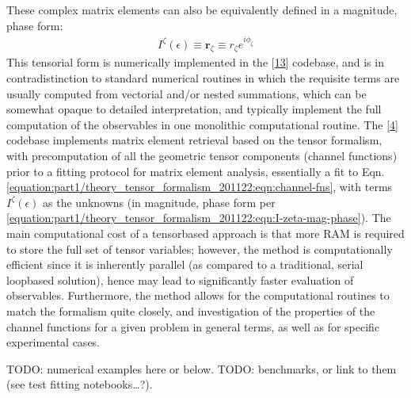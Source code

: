 \documentclass[letterpaper,table,10pt,english]{jupyterBook}
\begin{document}
\sphinxAtStartPar
These complex matrix elements can also be equivalently defined in a magnitude, phase
form:
\begin{equation}\label{equation:part1/theory_tensor_formalism_201122:eqn:I-zeta-mag-phase}
\begin{split}I^{\zeta}(\epsilon)\equiv\mathbf{r}_{\zeta}\equiv r_{\zeta}e^{i\phi_{\zeta}}\end{split}
\end{equation}
\sphinxAtStartPar
This tensorial form is numerically implemented in the  {[}\hyperlink{cite.backmatter/bibliography:id508}{13}{]} codebase, and is in contradistinction to standard numerical routines in which the requisite terms are usually computed from vectorial and/or nested summations, which can be somewhat opaque to
detailed interpretation, and typically implement the full computation of the observables in one monolithic computational routine. The  {[}\hyperlink{cite.backmatter/bibliography:id574}{4}{]} codebase implements matrix element retrieval based on the tensor formalism, with pre\sphinxhyphen{}computation of all the geometric tensor components (channel functions) prior to a fitting protocol for matrix element analysis, essentially a fit to Eqn. \eqref{equation:part1/theory_tensor_formalism_201122:eqn:channel-fns}, with terms \(I^{\zeta}(\epsilon)\) as the unknowns (in magnitude, phase form per \eqref{equation:part1/theory_tensor_formalism_201122:eqn:I-zeta-mag-phase}). The main computational cost of a tensor\sphinxhyphen{}based approach is that more RAM is required to store the full set of tensor variables; however, the method is computationally efficient since it is inherently parallel (as compared to a traditional, serial loop\sphinxhyphen{}based solution), hence may lead to significantly faster evaluation of observables. Furthermore, the method allows for the computational routines to match the formalism quite closely, and investigation of the properties of the channel functions for a given problem in general terms, as well as for specific experimental cases.

\sphinxAtStartPar
TODO: numerical examples here or below.
TODO: benchmarks, or link to them (see test fitting notebooks…?).
\end{document}
